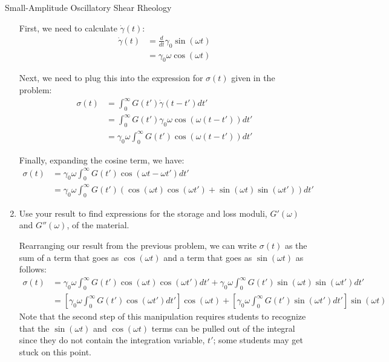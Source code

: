 \begin{activity}[extension]{Small-Amplitude Oscillatory Shear Rheology}
\begin{exercises}
\begin{enumerate}
					\begin{solution}{}
					
						First, we need to calculate $\dot\gamma(t)$:
						\begin{align*}
							\dot\gamma(t) &= \frac{d}{dt}\gamma_0\sin(\omega t) \\
							 &= \gamma_0 \omega \cos(\omega t)
						\end{align*}
						
						Next, we need to plug this into the expression for $\sigma(t)$ given in the problem:
						\begin{align*}
							\sigma(t) &= \int_0^{\infty} G(t') \dot\gamma(t-t') dt'\\
								&= \int_0^{\infty} G(t') \gamma_0 \omega\cos(\omega(t-t')) dt'\\
								&= \gamma_0 \omega \int_0^{\infty} G(t') \cos(\omega(t-t')) dt'
						\end{align*}
						
						Finally, expanding the cosine term, we have:
						\begin{align*}
							\sigma(t) &= \gamma_0 \omega\int_0^{\infty} G(t') \cos(\omega t-\omega t') dt'\\
								&= \gamma_0 \omega \int_0^{\infty} G(t') \left(\cos(\omega t)\cos(\omega t') + \sin(\omega t)\sin(\omega t')\right) dt'
						\end{align*}
						
					\end{solution}
				
				\item Use your result to find expressions for the storage and loss moduli, $G'(\omega)$ and $G''(\omega)$, of the material.
				
					\begin{solution}{}
					
						Rearranging our result from the previous problem, we can write $\sigma(t)$ as the sum of a term that goes as $\cos(\omega t)$ and  a term that goes as $\sin(\omega t)$ as follows:
						\begin{align*}
							\sigma(t) &= \gamma_0 \omega \int_0^{\infty} G(t') \cos(\omega t)\cos(\omega t')dt' + \gamma_0 \omega \int_0^{\infty} G(t') \sin(\omega t)\sin(\omega t') dt'\\
								&= \left[\gamma_0 \omega \int_0^{\infty} G(t') \cos(\omega t')dt'\right]\cos(\omega t) + \left[\gamma_0 \omega \int_0^{\infty} G(t') \sin(\omega t') dt'\right]\sin(\omega t)
						\end{align*}
						Note that the second step of this manipulation requires students to recognize that the $\sin(\omega t)$ and $\cos(\omega t)$ terms can be pulled out of the integral since they do not contain the integration variable, $t'$; some students may get stuck on this point.
						

\end{solution}
\end{enumerate}
\end{exercises}
\end{activity}
